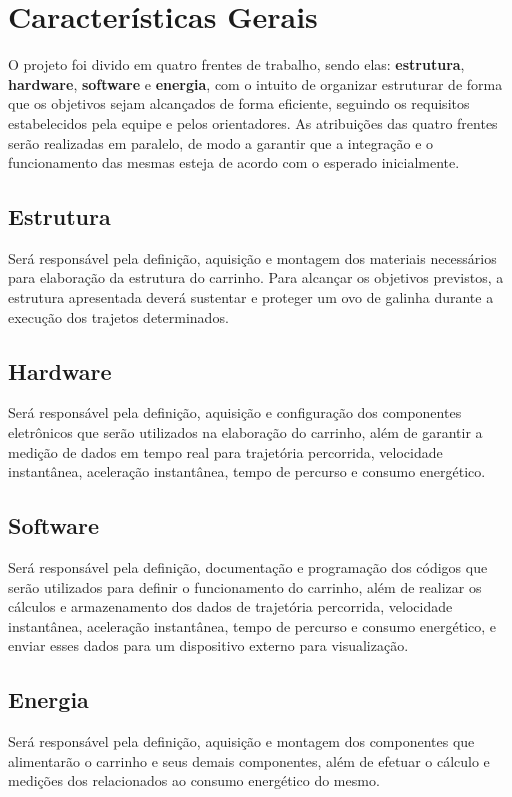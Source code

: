 \section{Características Gerais}

O projeto foi divido em quatro frentes de trabalho, sendo elas:
\textbf{estrutura}, \textbf{hardware}, \textbf{software} e \textbf{energia},
com o intuito de organizar estruturar de forma que os objetivos sejam alcançados
de forma eficiente, seguindo os requisitos estabelecidos pela equipe e pelos
orientadores. As atribuições das quatro frentes serão realizadas em paralelo, de
modo a garantir que a integração e o funcionamento das mesmas esteja de acordo
com o esperado inicialmente.

\subsection{Estrutura}

Será responsável pela definição, aquisição e montagem dos materiais necessários
para elaboração da estrutura do carrinho. Para alcançar os objetivos previstos,
a estrutura apresentada deverá sustentar e proteger um ovo de galinha durante a
execução dos trajetos determinados.

\subsection{Hardware}

Será responsável pela definição, aquisição e configuração dos componentes
eletrônicos que serão utilizados na elaboração do carrinho, além de garantir a
medição de dados em tempo real para trajetória percorrida, velocidade
instantânea, aceleração instantânea, tempo de percurso e consumo energético.

\subsection{Software}

Será responsável pela definição, documentação e programação dos códigos que
serão utilizados para definir o funcionamento do carrinho, além de realizar os
cálculos e armazenamento dos dados de trajetória percorrida, velocidade
instantânea, aceleração instantânea, tempo de percurso e consumo energético, e
enviar esses dados para um dispositivo externo para visualização.

\subsection{Energia}

Será responsável pela definição, aquisição e montagem dos componentes que
alimentarão o carrinho e seus demais componentes, além de efetuar o cálculo e
medições dos relacionados ao consumo energético do mesmo.
